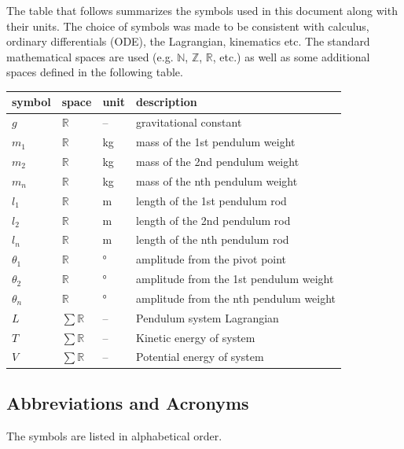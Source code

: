\documentclass[12pt]{article}
\begin{document}
The table that follows summarizes the symbols used in this document along with
their units. The choice of symbols was made to be consistent with calculus, 
ordinary differentials (ODE), the Lagrangian, kinematics etc. The standard 
mathematical spaces are used (e.g. $\mathbb{N}$, $\mathbb{Z}$, $\mathbb{R}$, 
etc.) as well as some additional spaces defined in the following table. 
~\newline
\renewcommand{\arraystretch}{1.2}
\noindent \begin{longtable*}{l l l p{8cm}} \toprule
\textbf{symbol} & \textbf{space} & \textbf{unit} & \textbf{description}\\
\midrule 
$g$ & $\mathbb{R}$ & -- & gravitational constant
\\
$m_1$ & $\mathbb{R}$ & kg & mass of the 1st pendulum weight
\\ 
$m_2$ & $\mathbb{R}$ & kg & mass of the 2nd pendulum weight
\\ 
$m_n$ & $\mathbb{R}$ & kg & mass of the nth pendulum weight
\\ 
$l_1$ & $\mathbb{R}$ & m & length of the 1st pendulum rod
\\ 
$l_2$ & $\mathbb{R}$ & m & length of the 2nd pendulum rod
\\ 
$l_n$ & $\mathbb{R}$ & m & length of the nth pendulum rod
\\
$\theta_1$ & $\mathbb{R}$ & \si{\degree} & amplitude from 
the pivot point
\\
$\theta_2$ & $\mathbb{R}$ & \si{\degree} & amplitude from 
the 1st pendulum weight
\\
$\theta_n$ & $\mathbb{R}$ & \si{\degree} & amplitude from 
the nth pendulum weight
\\
$L$ & $\sum\mathbb{R}$ & -- & Pendulum system Lagrangian
\\
$T$ & $\sum\mathbb{R}$ & -- & Kinetic energy of system
\\
$V$ & $\sum\mathbb{R}$ & -- & Potential energy of system
\\
\bottomrule
\end{longtable*}
\newpage
\subsection{Abbreviations and Acronyms}

The symbols are listed in alphabetical order.\\
\end{document}
